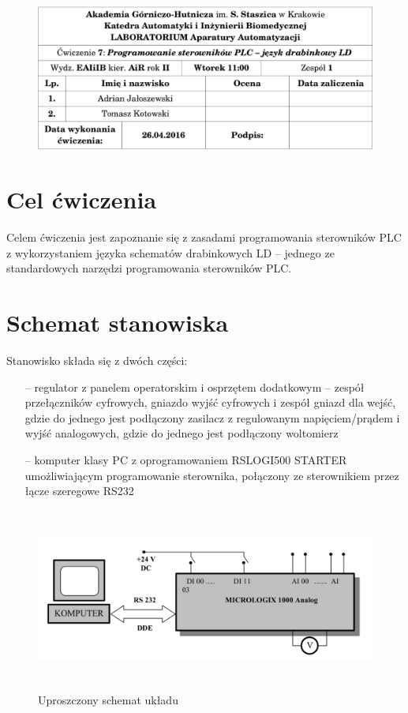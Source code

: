 \documentclass[a4paper, 12pt]{article}
\begin{document}
	\begin{figure}[H]
		\centering
		\includegraphics[width = \textwidth]{./img/cudo.png}
	\end{figure}
	\section{Cel ćwiczenia}
		Celem ćwiczenia jest zapoznanie się z zasadami programowania sterowników PLC z wykorzystaniem języka schematów drabinkowych LD -- jednego ze standardowych narzędzi programowania sterowników PLC.
	\section{Schemat stanowiska}
		Stanowisko składa się z dwóch części: 
		\begin{itemize}
			\item[--] regulator z panelem operatorskim i osprzętem dodatkowym -- zespół przełączników cyfrowych, gniazdo wyjść cyfrowych i zespół gniazd dla wejść, gdzie do jednego jest podłączony zasilacz z regulowanym napięciem/prądem i wyjść analogowych, gdzie do jednego jest podłączony woltomierz
			\item[--] komputer klasy PC z oprogramowaniem RSLOGI500 STARTER umożliwiającym programowanie sterownika, połączony ze sterownikiem przez łącze szeregowe RS232
		\end{itemize}
		\begin{figure}[H]
			\centering
			\includegraphics[height=6cm, width=\textwidth]{./img/schemat.png}
			\caption{Uproszczony schemat układu}
		\end{figure}
\end{document}
